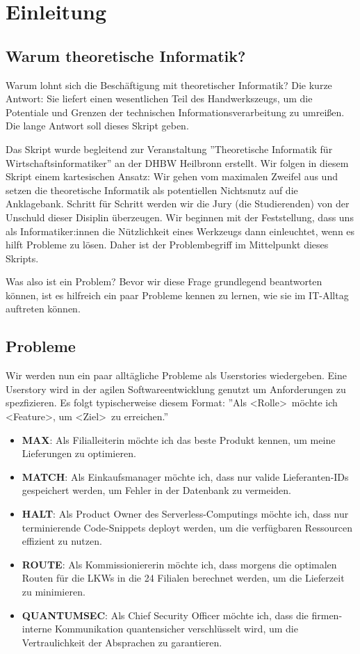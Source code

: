 \chapter{Einleitung}
\section{Warum theoretische Informatik?}
Warum lohnt sich die Beschäftigung mit theoretischer Informatik?
Die kurze Antwort: Sie liefert einen wesentlichen Teil des Handwerkszeugs,
um die Potentiale und Grenzen der technischen Informationsverarbeitung zu umreißen.
Die lange Antwort soll dieses Skript geben.

Das Skript wurde begleitend zur Veranstaltung ''Theoretische Informatik für Wirtschaftsinformatiker''
an der DHBW Heilbronn erstellt.
Wir folgen in diesem Skript einem kartesischen Ansatz:
Wir gehen vom maximalen Zweifel aus und setzen die theoretische Informatik
als potentiellen Nichtsnutz auf die Anklagebank.
Schritt für Schritt werden wir die Jury (die Studierenden) von der Unschuld dieser
Disiplin überzeugen.
Wir beginnen mit der Feststellung, dass uns als Informatiker:innen die Nützlichkeit
eines Werkzeugs dann einleuchtet, wenn es hilft Probleme zu lösen.
Daher ist der Problembegriff im Mittelpunkt dieses Skripts.

Was also ist ein Problem?
Bevor wir diese Frage grundlegend beantworten können,
ist es hilfreich ein paar Probleme kennen zu lernen,
wie sie im IT-Alltag auftreten können.

\section{Probleme}
Wir werden nun ein paar alltägliche Probleme als Userstories wiedergeben.
Eine Userstory wird in der agilen Softwareentwicklung genutzt um Anforderungen zu spezfizieren.
Es folgt typischerweise diesem Format:
''Als \textless Rolle\textgreater\ möchte ich \textless Feature\textgreater,
um \textless Ziel\textgreater\ zu erreichen.''

\begin{itemize}
    \item \textbf{MAX}: Als Filialleiterin möchte ich das beste Produkt kennen,
        um meine Lieferungen zu optimieren.
    \item \textbf{MATCH}: Als Einkaufsmanager möchte ich,
        dass nur valide Lieferanten-IDs gespeichert werden,
        um Fehler in der Datenbank zu vermeiden.
    \item \textbf{HALT}: Als Product Owner des Serverless-Computings möchte ich,
        dass nur terminierende Code-Snippets deployt werden,
        um die verfügbaren Ressourcen effizient zu nutzen.
    \item \textbf{ROUTE}: Als Kommissioniererin möchte ich,
        dass morgens die optimalen Routen für die LKWs in die 24 Filialen berechnet werden,
        um die Lieferzeit zu minimieren.
    \item \textbf{QUANTUMSEC}: Als Chief Security Officer möchte ich,
        dass die firmen-interne Kommunikation quantensicher verschlüsselt wird,
        um die Vertraulichkeit der Absprachen zu garantieren.
\end{itemize}

